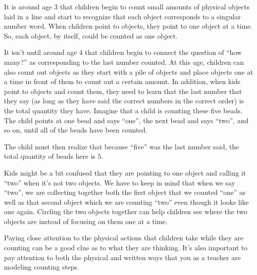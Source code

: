 \documentclass{ximera}
\begin{document}
It is around age 3 that children begin to count small amounts of physical objects laid in a line and start to recognize that each object corresponds to a singular number word. When children point to objects, they point to one object at a time. So, each object, by itself, could be counted as one object. 
\begin{image}
\end{image}



It isn't until around  age  4 that children begin to connect the question of ``how many?'' as corresponding to the last number counted. At this age, children can also count out objects as they start with a pile of objects and place objects one at a time in front of them to count out a certain amount. In addition, when kids point to objects and count them, they need to learn that the last number that they say (as long as they have said the correct numbers in the correct order) is the total quantity they have. Imagine that a child is counting these five beads. The child points at one bead and says ``one'', the next bead and says ``two'', and so on, until all of the beads have been counted. 

\begin{image}
\end{image}
The child must then realize that because ``five'' was the last number said, the total quantity of beads here is $5$.

Kids might be a bit confused that they are pointing to one object and calling it ``two'' when it's not two objects. We have to keep in mind that when we say ``two'', we are collecting together both the first object that we counted ``one'' as well as that second object which we are counting ``two'' even though it looks like one again. Circling the two objects together can help children see where the two objects are instead of focusing on them one at a time.

\begin{image}
\end{image}
Paying close attention to the physical actions that children take while they are counting can be a good clue as to what they are thinking. It's also important to pay attention to both the physical and written ways that you as a teacher are modeling counting steps.
\end{document}
